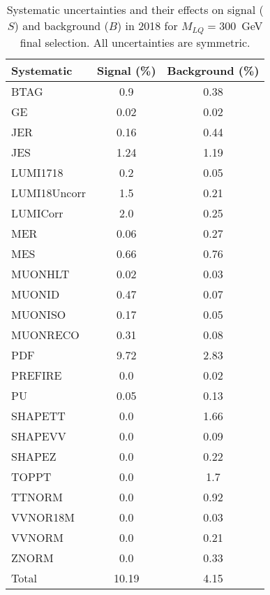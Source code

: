 \begin{table}[htbp]
\begin{center}
\caption{Systematic uncertainties and their effects on signal ($S$) and background ($B$) in 2018 for $M_{LQ}=300$~GeV final selection. All uncertainties are symmetric.}
\begin{tabular}{lcc}
\hline\hline
Systematic & Signal (\%) & Background (\%) \\ \hline 
BTAG & 0.9 & 0.38\\ 
GE & 0.02 & 0.02\\ 
JER & 0.16 & 0.44\\ 
JES & 1.24 & 1.19\\ 
LUMI1718 & 0.2 & 0.05\\ 
LUMI18Uncorr & 1.5 & 0.21\\ 
LUMICorr & 2.0 & 0.25\\ 
MER & 0.06 & 0.27\\ 
MES & 0.66 & 0.76\\ 
MUONHLT & 0.02 & 0.03\\ 
MUONID & 0.47 & 0.07\\ 
MUONISO & 0.17 & 0.05\\ 
MUONRECO & 0.31 & 0.08\\ 
PDF & 9.72 & 2.83\\ 
PREFIRE & 0.0 & 0.02\\ 
PU & 0.05 & 0.13\\ 
SHAPETT & 0.0 & 1.66\\ 
SHAPEVV & 0.0 & 0.09\\ 
SHAPEZ & 0.0 & 0.22\\ 
TOPPT & 0.0 & 1.7\\ 
TTNORM & 0.0 & 0.92\\ 
VVNOR18M & 0.0 & 0.03\\ 
VVNORM & 0.0 & 0.21\\ 
ZNORM & 0.0 & 0.33\\ 
Total & 10.19 & 4.15\\ \hline \hline
\end{tabular}
\label{tab:SysUncertainties_uujj_300}
\end{center}
\end{table}

